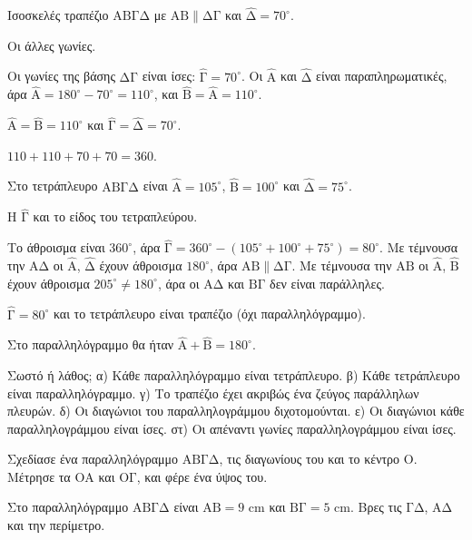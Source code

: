 \tixero Ισοσκελές τραπέζιο $\mathrm{ΑΒΓΔ}$ με $\mathrm{ΑΒ}\parallel\mathrm{ΔΓ}$ και $\hat{\mathrm{Δ}}=70^\circ$.\par
\tithelo Οι άλλες γωνίες.\par
\possindeo Οι γωνίες της βάσης $\mathrm{ΔΓ}$ είναι ίσες: $\hat{\mathrm{Γ}}=70^\circ$. Οι $\hat{\mathrm{Α}}$ και $\hat{\mathrm{Δ}}$ είναι παραπληρωματικές, άρα $\hat{\mathrm{Α}}=180^\circ-70^\circ=110^\circ$, και $\hat{\mathrm{Β}}=\hat{\mathrm{Α}}=110^\circ$.\par
\apantisi $\hat{\mathrm{Α}}=\hat{\mathrm{Β}}=110^\circ$ και $\hat{\mathrm{Γ}}=\hat{\mathrm{Δ}}=70^\circ$.\par
\elegxos $110+110+70+70=360$.

\tixero Στο τετράπλευρο $\mathrm{ΑΒΓΔ}$ είναι $\hat{\mathrm{Α}}=105^\circ$, $\hat{\mathrm{Β}}=100^\circ$ και $\hat{\mathrm{Δ}}=75^\circ$.\par
\tithelo Η $\hat{\mathrm{Γ}}$ και το είδος του τετραπλεύρου.\par
\possindeo Το άθροισμα είναι $360^\circ$, άρα $\hat{\mathrm{Γ}}=360^\circ-(105^\circ+100^\circ+75^\circ)=80^\circ$. Με τέμνουσα την $\mathrm{ΑΔ}$ οι $\hat{\mathrm{Α}}$, $\hat{\mathrm{Δ}}$ έχουν άθροισμα $180^\circ$, άρα $\mathrm{ΑΒ}\parallel\mathrm{ΔΓ}$. Με τέμνουσα την $\mathrm{ΑΒ}$ οι $\hat{\mathrm{Α}}$, $\hat{\mathrm{Β}}$ έχουν άθροισμα $205^\circ\neq180^\circ$, άρα οι $\mathrm{ΑΔ}$ και $\mathrm{ΒΓ}$ δεν είναι παράλληλες.\par
\apantisi $\hat{\mathrm{Γ}}=80^\circ$ και το τετράπλευρο είναι τραπέζιο (όχι παραλληλόγραμμο).\par
\elegxos Στο παραλληλόγραμμο θα ήταν $\hat{\mathrm{Α}}+\hat{\mathrm{Β}}=180^\circ$.



\ex Σωστό ή λάθος; α) Κάθε παραλληλόγραμμο είναι τετράπλευρο. β) Κάθε τετράπλευρο είναι παραλληλόγραμμο. γ) Το τραπέζιο έχει ακριβώς ένα ζεύγος παράλληλων πλευρών. δ) Οι διαγώνιοι του παραλληλογράμμου διχοτομούνται. ε) Οι διαγώνιοι κάθε παραλληλογράμμου είναι ίσες. στ) Οι απέναντι γωνίες παραλληλογράμμου είναι ίσες.

\ex Σχεδίασε ένα παραλληλόγραμμο $\mathrm{ΑΒΓΔ}$, τις διαγωνίους του και το κέντρο $\mathrm{Ο}$. Μέτρησε τα $\mathrm{ΟΑ}$ και $\mathrm{ΟΓ}$, και φέρε ένα ύψος του.

\ex Στο παραλληλόγραμμο $\mathrm{ΑΒΓΔ}$ είναι $\mathrm{ΑΒ}=9$ cm και $\mathrm{ΒΓ}=5$ cm. Βρες τις $\mathrm{ΓΔ}$, $\mathrm{ΑΔ}$ και την περίμετρο.

